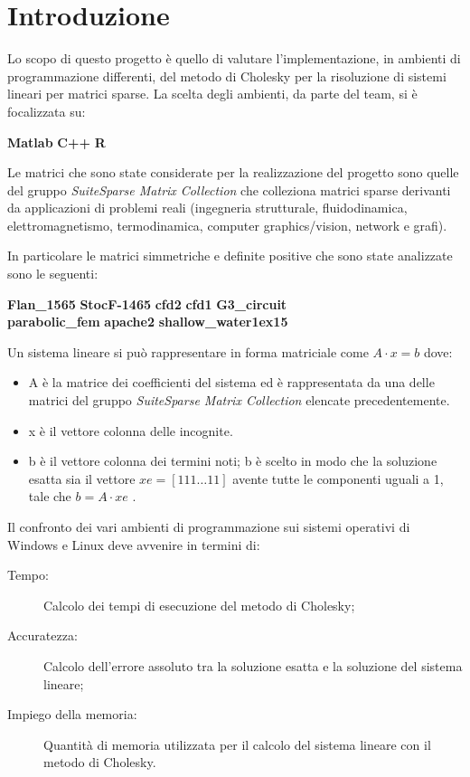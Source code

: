\section{Introduzione} 

Lo scopo di questo progetto è quello di valutare l’implementazione, in ambienti di programmazione differenti, del metodo di Cholesky per la risoluzione di sistemi lineari per matrici sparse. La scelta degli ambienti, da parte del team, si è focalizzata su:

\begin{center}
\textbf{Matlab} \qquad \textbf{C++} \qquad \textbf{R}
\end{center}

Le matrici che sono state considerate per la realizzazione del progetto sono quelle del gruppo \textit{SuiteSparse Matrix Collection} che colleziona matrici sparse derivanti da applicazioni di problemi reali (ingegneria strutturale, fluidodinamica, elettromagnetismo, termodinamica, computer graphics/vision, network e grafi).

In particolare le matrici simmetriche e definite positive che sono state analizzate sono le seguenti:
\begin{center}
\textbf{Flan\_1565} \quad \textbf{StocF-1465} \quad \textbf{cfd2} \quad \textbf{cfd1} \quad \textbf{G3\_circuit} \\
\textbf{parabolic\_fem} \quad \textbf{apache2} \quad \textbf{shallow\_water1}\quad \textbf{ex15}
\end{center}

Un sistema lineare si può rappresentare in forma matriciale come $ A \cdot x = b $
dove:
\begin{itemize}
\item A è la matrice dei coefficienti del sistema ed è rappresentata da una delle matrici del gruppo \textit{SuiteSparse Matrix Collection} elencate precedentemente.
\item x è il vettore colonna delle incognite.
\item b è il vettore colonna dei termini noti; b è scelto in modo che la soluzione esatta sia il vettore $ xe = [1 1 1 \dots 1 1] $ avente tutte le componenti uguali a 1, tale che $ b = A \cdot xe $ .
\end{itemize}

\newpage

Il confronto dei vari ambienti di programmazione sui sistemi operativi di Windows e Linux deve avvenire in termini di:
\begin{description}
\item[Tempo:] Calcolo dei tempi di esecuzione del metodo di Cholesky;
\item[Accuratezza:] Calcolo dell'errore assoluto tra la soluzione esatta e la soluzione del sistema lineare;
\item[Impiego della memoria:] Quantità di memoria utilizzata per il calcolo del sistema lineare con il metodo di Cholesky.
\end{description}

